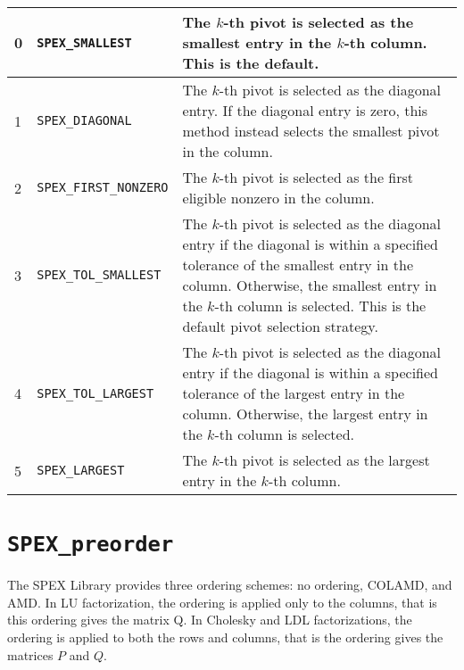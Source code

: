 \documentclass[12pt,oneside]{book}
\theoremstyle{definition}
\newenvironment{SizedCenteredTabular}[2][\small]
    {   
        #1\begin{center}\begin{tabular}{#2}
    }{ 
        \end{tabular}\end{center}
    }
\begin{document}
\begin{SizedCenteredTabular}{llp{4in}}\hline
    0 & \verb|SPEX_SMALLEST|        & The $k$-th pivot is selected as the smallest 
                                      entry in the $k$-th column.  This is the default. \\ \hline
    1 & \verb|SPEX_DIAGONAL|        & The $k$-th pivot is selected as the diagonal
                                      entry. If the diagonal entry is zero,
                                      this method instead selects the smallest
                                      pivot in the column.\\ \hline
    2 & \verb|SPEX_FIRST_NONZERO|   & The $k$-th pivot is selected as the first
                                      eligible nonzero in the column. \\ \hline
    3 & \verb|SPEX_TOL_SMALLEST|    & The $k$-th pivot is selected as the diagonal
                                      entry if the diagonal is within a
                                      specified tolerance of the smallest entry in
                                      the column. Otherwise, the smallest
                                      entry in the $k$-th column is selected.
                                      This is the default pivot selection
                                      strategy. \\ \hline
    4 & \verb|SPEX_TOL_LARGEST|     & The $k$-th pivot is selected as the diagonal
                                      entry if the diagonal is within a
                                      specified tolerance of the largest entry in
                                      the column.  Otherwise, the largest
                                      entry in the $k$-th column is selected. \\ \hline
    5 & \verb|SPEX_LARGEST|         & The $k$-th pivot is selected as the largest
                                          entry in the $k$-th column. \\ \hline
\end{SizedCenteredTabular}

\section{\texttt{SPEX\_preorder}} \label{ss:SPEX_preorder}
The SPEX Library provides three ordering schemes: no ordering, COLAMD, and AMD. In LU factorization, the ordering is applied only to the columns, that is this ordering gives the matrix Q. In Cholesky and LDL factorizations, the ordering is applied to both the rows and columns, that is the ordering gives the matrices $P$ and $Q$.
\end{document}

